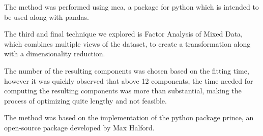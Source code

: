 {The method was performed using mca, a package for python which is intended to be used along with pandas. \cite{80}

The third and final technique we explored is Factor Analysis of Mixed Data, which combines multiple views of the dataset, to create a transformation along with a dimensionality reduction. 

The number of the resulting components was chosen based on the fitting time, however it was quickly observed that above 12 components, the time needed for computing the resulting components was more than substantial, making the process of optimizing quite lengthy and not feasible. 

The method was based on the implementation of the python package prince, an open-source package developed by Max Halford. \cite{81} 
}
